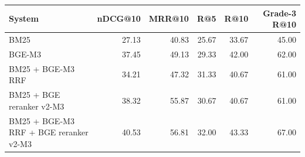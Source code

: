 \begin{tabular}{lrrrrr}
\toprule
System & nDCG@10 & MRR@10 & R@5 & R@10 & Grade-3 R@10 \\
\midrule
BM25 & 27.13 & 40.83 & 25.67 & 33.67 & 45.00 \\
BGE-M3 & 37.45 & 49.13 & 29.33 & 42.00 & 62.00 \\
BM25 + BGE-M3 RRF & 34.21 & 47.32 & 31.33 & 40.67 & 61.00 \\
BM25 + BGE reranker v2-M3 & 38.32 & 55.87 & 30.67 & 40.67 & 61.00 \\
BM25 + BGE-M3 RRF + BGE reranker v2-M3 & 40.53 & 56.81 & 32.00 & 43.33 & 67.00 \\
\bottomrule
\end{tabular}
